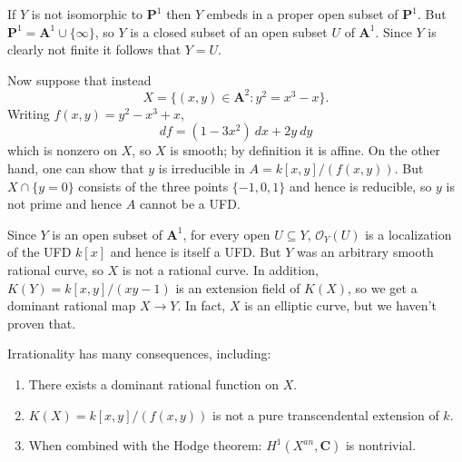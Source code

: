 \documentclass[reqno,12pt,letterpaper]{amsart}
\newcommand{\CC}{\mathbf{C}}
\newcommand{\PP}{\mathbf P}
\newcommand{\Aff}{\mathbf A}
\newcommand{\Olo}{\mathscr O}
\theoremstyle{definition}
\begin{document}
If $Y$ is not isomorphic to $\PP^1$ then $Y$ embeds in a proper open subset of $\PP^1$.
But $\PP^1 = \Aff^1 \cup \{\infty\}$, so $Y$ is a closed subset of an open subset $U$ of $\Aff^1$.
Since $Y$ is clearly not finite it follows that $Y = U$.

Now suppose that instead
$$X = \{(x, y) \in \Aff^2: y^2 = x^3 - x\}.$$
Writing $f(x, y) = y^2 - x^3 + x$,
$$df = (1 - 3x^2) ~dx + 2y ~dy$$
which is nonzero on $X$, so $X$ is smooth; by definition it is affine.
On the other hand, one can show that $y$ is irreducible in $A = k[x, y]/(f(x, y))$.
But $X \cap \{y = 0\}$ consists of the three points $\{-1, 0, 1\}$ and hence is reducible, so $y$ is not prime and hence $A$ cannot be a UFD.

Since $Y$ is an open subset of $\Aff^1$, for every open $U \subseteq Y$, $\Olo_Y(U)$ is a localization of the UFD $k[x]$ and hence is itself a UFD.
But $Y$ was an arbitrary smooth rational curve, so $X$ is not a rational curve.
In addition, $K(Y) = k[x, y]/(xy - 1)$ is an extension field of $K(X)$, so we get a dominant rational map $X \to Y$.
In fact, $X$ is an elliptic curve, but we haven't proven that.

Irrationality has many consequences, including:
\begin{enumerate}
\item There exists a dominant rational function on $X$.
\item $K(X) = k[x, y]/(f(x, y))$ is not a pure transcendental extension of $k$.
\item When combined with the Hodge theorem: $H^1(X^{an}, \CC)$ is nontrivial.
\end{enumerate}

\appendix
\end{document}
